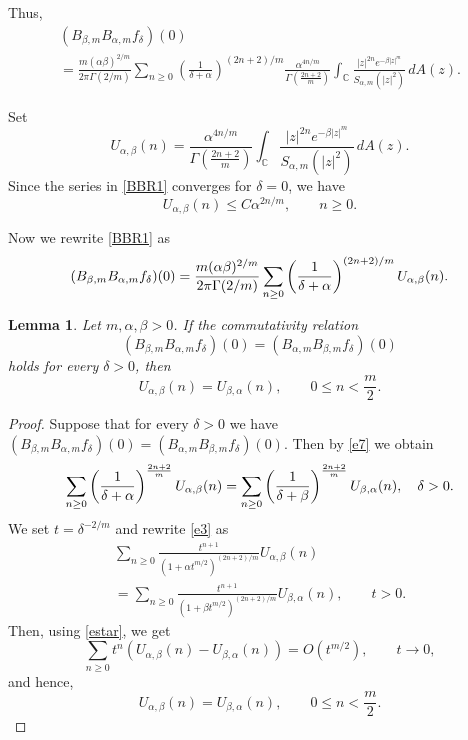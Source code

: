 \documentclass[12pt]{amsart}
\numberwithin{equation}{section}
\newtheorem{lemma}[thm]{Lemma}
\theoremstyle{plain}
\numberwithin{equation}{section}
\begin{document}
Thus,
\begin{multline}\label{BBR1}
(B_{\beta,m}B_{\alpha,m}f_\delta)(0) \\=  \frac{m (\alpha\beta)^{2/m}}{2\pi\Gamma(2/m)}\sum_{n\ge 0}  
   \left(\frac{1}{\delta+\alpha}\right)^{(2n+2)/m} \frac{ \alpha^{4n/m}}{\Gamma(\frac{2n+2}{m})} \int_{\mathbb C}  \frac{  |z|^{2n} e^{-  \beta |z|^m}  }{ S_{\alpha,m}(|z|^2)}\,dA(z).
\end{multline}

Set
$$
U_{\alpha,\beta}(n)=\frac{ \alpha^{4n/m}}{\Gamma(\frac{2n+2}{m})} \int_{\mathbb C}  \frac{  |z|^{2n} e^{-  \beta |z|^m}  }{ S_{\alpha,m}(|z|^2)}\,dA(z).
$$
Since the series in \eqref{BBR1} converges for $\delta=0$, we have
\begin{equation}
U_{\alpha,\beta}(n)\le C\alpha^{2n/m},\qquad  n\ge 0.
\label{estar}
\end{equation}


Now we rewrite \eqref{BBR1} as
\begin{equation}
(B_{\beta,m}B_{\alpha,m}f_\delta)(0) \\=  \frac{m (\alpha\beta)^{2/m}}{2\pi\Gamma(2/m)}\sum_{n\ge 0}  
   \left(\frac{1}{\delta+\alpha}\right)^{(2n+2)/m} U_{\alpha,\beta}(n).
\label{e7}
\end{equation}

\begin{lemma}\label{l1} Let $m,\alpha,\beta>0$. If the commutativity relation 
$$ 
(B_{\beta,m}B_{\alpha,m}f_\delta)(0)=(B_{\alpha,m} B_{\beta,m}f_\delta)(0)
$$
holds for every $\delta>0$, then 
\begin{equation}
U_{\alpha,\beta}(n)=U_{\beta,\alpha}(n),\qquad 0\le n<\frac{m}2.
\label{e8}
\end{equation}
\label{lem1}
\end{lemma}

\begin{proof} 
Suppose that for every $\delta>0$ we have 
$(B_{\beta,m}B_{\alpha,m}f_\delta)(0)=(B_{\alpha,m} B_{\beta,m}f_\delta)(0)$. Then by \eqref{e7} we obtain 
\begin{equation}
\sum_{n\ge 0} \left(\frac{1}{\delta+\alpha}\right)^{\frac{2n+2}m}U_{\alpha,\beta}(n)
\\=\sum_{n\ge 0} \left(\frac{1}{\delta+\beta}\right)^{\frac{2n+2}m}U_{\beta,\alpha}(n),\quad \delta>0.\label{e3}
\end{equation}
We set $t=\delta^{-2/m}$ and rewrite \eqref{e3} as 
\begin{multline}
\sum_{n\ge 0} \frac{t^{n+1}}{(1+\alpha t^{m/2})^{(2n+2)/m}}U_{\alpha,\beta}(n)\\=\sum_{n\ge 0} \frac{t^{n+1}}{(1+\beta t^{m/2})^{(2n+2)/m}}U_{\beta,\alpha}(n),\qquad t>0.
\label{e4}
\end{multline}
Then, using \eqref{estar}, we get
$$
\sum_{n\ge 0}t^n(U_{\alpha,\beta}(n)-U_{\beta,\alpha}(n))=O(t^{m/2}), \qquad t\to 0,
$$
and hence, 
$$
U_{\alpha,\beta}(n)=U_{\beta,\alpha}(n),\qquad 0\le n<\frac{m}2.
$$
\end{proof}
\end{document}
